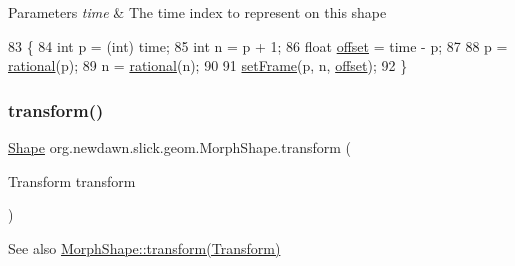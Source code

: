 \begin{DoxyParams}{Parameters}
{\em time} & The time index to represent on this shape \\
\hline
\end{DoxyParams}

\begin{DoxyCode}
83                                          \{
84         \textcolor{keywordtype}{int} p = (int) time;
85         \textcolor{keywordtype}{int} n = p + 1;
86         \textcolor{keywordtype}{float} \mbox{\hyperlink{classorg_1_1newdawn_1_1slick_1_1geom_1_1_morph_shape_a006e01581d798601f1aaf5bea5dc1583}{offset}} = time - p;
87         
88         p = \mbox{\hyperlink{classorg_1_1newdawn_1_1slick_1_1geom_1_1_morph_shape_ad93f28ac5dd367627bfadbd8fec48213}{rational}}(p);
89         n = \mbox{\hyperlink{classorg_1_1newdawn_1_1slick_1_1geom_1_1_morph_shape_ad93f28ac5dd367627bfadbd8fec48213}{rational}}(n);
90         
91         \mbox{\hyperlink{classorg_1_1newdawn_1_1slick_1_1geom_1_1_morph_shape_acc6cd1ff5332979f86cc03d8bb520846}{setFrame}}(p, n, \mbox{\hyperlink{classorg_1_1newdawn_1_1slick_1_1geom_1_1_morph_shape_a006e01581d798601f1aaf5bea5dc1583}{offset}});
92     \}
\end{DoxyCode}
\mbox{\label{classorg_1_1newdawn_1_1slick_1_1geom_1_1_morph_shape_a4b172f77f9d468bbcca6b36849a51ed3}} 
\subsubsection{\texorpdfstring{transform()}{transform()}}
{\footnotesize\ttfamily \mbox{\hyperlink{classorg_1_1newdawn_1_1slick_1_1geom_1_1_shape}{Shape}} org.\+newdawn.\+slick.\+geom.\+Morph\+Shape.\+transform (\begin{DoxyParamCaption}\item[{Transform}]{transform }\end{DoxyParamCaption})\hspace{0.3cm}{\ttfamily [inline]}}

\begin{DoxySeeAlso}{See also}
\mbox{\hyperlink{classorg_1_1newdawn_1_1slick_1_1geom_1_1_morph_shape_a4b172f77f9d468bbcca6b36849a51ed3}{Morph\+Shape\+::transform(\+Transform)}} 
\end{DoxySeeAlso}

